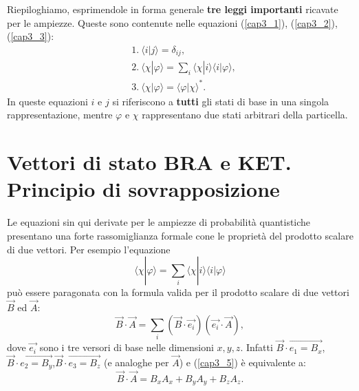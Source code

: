 Riepiloghiamo, esprimendole in forma generale \textbf{tre leggi importanti} ricavate per le ampiezze.
Queste sono contenute nelle equazioni (\ref{cap3_1}), (\ref{cap3_2}), (\ref{cap3_3}):
	\begin{equation}
		\boxed{\boxed{
			\begin{aligned}
				&\textrm{1.}\ \langle i | j \rangle=\delta_{ij},\\
				&\textrm{2.}\ \langle \chi | \varphi \rangle=\sum \limits_{i} \langle \chi | i \rangle \langle i | \varphi \rangle,\\
				&\textrm{3.}\ \langle \chi | \varphi \rangle = \langle \varphi | \chi \rangle ^* .
			\end{aligned}
			}}
	\end{equation}
In queste equazioni $i$ e $j$ si riferiscono a \textbf{tutti} gli stati di base in una singola rappresentazione, mentre $\varphi$ e $\chi$ rappresentano due stati arbitrari della particella.

\section[Principio di sovrapposizione]{Vettori di stato BRA e KET. Principio di sovrapposizione} 

Le equazioni sin qui derivate per le ampiezze di probabilità quantistiche presentano una forte rassomiglianza formale cone le proprietà del prodotto scalare di due vettori. Per esempio l'equazione
	\begin{equation}
		\langle \chi | \varphi \rangle =\sum \limits_{i}\langle \chi | i \rangle \langle i | \varphi \rangle
	\label{cap3_4}
	\end{equation}
può essere paragonata con la formula valida per il prodotto scalare di due vettori $\vec{B}$ ed $\vec{A}$:
	\begin{equation}
		\vec{B} \cdot \vec{A}= \sum \limits_{i} (\vec{B} \cdot  \vec{e_i})(\vec{e_i} \cdot \vec{A}) ,
	\label{cap3_5}
	\end{equation}
dove $\vec{e_i}$ sono i tre versori di base nelle dimensioni $x,y,z$. Infatti $\vec{B}\cdot \vec{e_1=B_x}$, $\vec{B}\cdot \vec{e_2=B_y}$,$\vec{B}\cdot \vec{e_3=B_z}$ (e analoghe per  $\vec{A}$) e (\eqref{cap3_5}) è equivalente a:
	\begin{equation}
		\vec{B} \cdot \vec{A} = B_xA_x+B_yA_y+B_zA_z .
	\end{equation}
	
